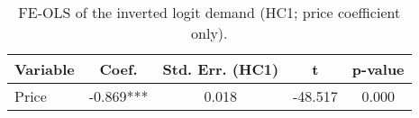 \begin{table}[H]
\centering
\begin{tabular}{lcccc}
\toprule
Variable & Coef. & Std. Err. (HC1) & t & p-value \\
\midrule
Price & -0.869*** & 0.018 & -48.517 & 0.000 \\
\bottomrule
\end{tabular}
\caption{FE-OLS of the inverted logit demand (HC1; price coefficient only).}
\label{tab:q10_fe_ols_price}
\end{table}
